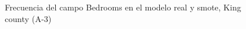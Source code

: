 \begin{figure}[H]
    \centering
    
    \caption{Frecuencia del campo Bedrooms en el modelo real y smote, King county (A-3)}
    \label{frecuency-smote-bedrooms}
\end{figure}